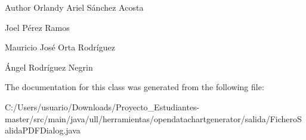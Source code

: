 \begin{DoxyAuthor}{Author}
Orlandy Ariel Sánchez Acosta 

Joel Pérez Ramos 

Mauricio José Orta Rodríguez 

Ángel Rodríguez Negrin 
\end{DoxyAuthor}


The documentation for this class was generated from the following file\+:\begin{DoxyCompactItemize}
\item 
C\+:/\+Users/usuario/\+Downloads/\+Proyecto\+\_\+\+Estudiantes-\/master/src/main/java/ull/herramientas/opendatachartgenerator/salida/Fichero\+Salida\+P\+D\+F\+Dialog.\+java\end{DoxyCompactItemize}
